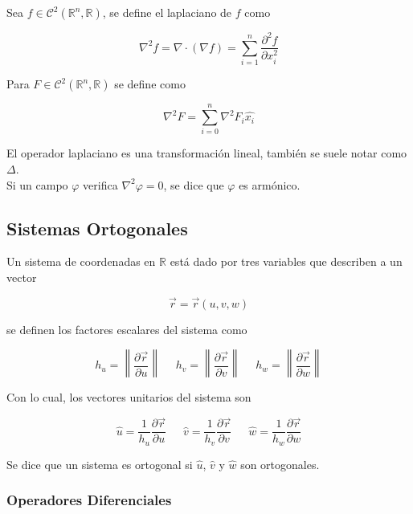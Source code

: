 Sea $f\in\mathcal{C}^2(\mathbb{R}^n, \mathbb{R})$, se define el laplaciano de $f$ como

\[\nabla^2 f = \nabla\cdot(\nabla f) =
\sum^n_{i=1}\frac{\partial^2f}{\partial x_i^2}\]
\bigbreak
\bigbreak

Para $F\in\mathcal{C}^2(\mathbb{R}^n, \mathbb{R})$ se define como

\[\nabla^2 F = \sum^n_{i=0}\nabla^2F_i\hat{x_i}\]
\bigbreak
\bigbreak

El operador laplaciano es una transformación lineal, también se suele notar como $\Delta$.\\

Si un campo $\varphi$ verifica $\nabla^2\varphi=0$, se dice que $\varphi$ es armónico.

\subsection{Sistemas Ortogonales}

Un sistema de coordenadas en $\mathbb{R}$ está dado por tres variables que describen a un vector

\[\Vec{r} = \Vec{r}(u,v,w)\]

se definen los factores escalares del sistema como

\[h_u=\left\|\frac{\partial\Vec{r}}{\partial u}\right
\|\,\,\,\,\,\,\,\,
h_v=\left\|\frac{\partial\Vec{r}}{\partial v}\right\|\,\,\,\,\,\,\,\,
h_w=\left\|\frac{\partial\Vec{r}}{\partial w}\right\|\]

Con lo cual, los vectores unitarios del sistema son

\[\hat{u}=\frac{1}{h_u}\frac{\partial\Vec{r}}{\partial u}
\,\,\,\,\,\,\,\,\,
\hat{v}=\frac{1}{h_v}\frac{\partial\Vec{r}}{\partial v}\,\,\,\,\,\,\,\,\,
\hat{w}=\frac{1}{h_w}\frac{\partial\Vec{r}}{\partial w}\]

\bigbreak
Se dice que un sistema es ortogonal si $\hat{u}$, $\hat{v}$ y $\hat{w}$ son ortogonales.

\subsubsection{Operadores Diferenciales}

